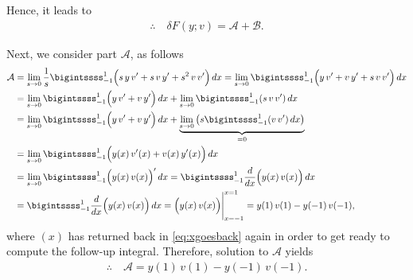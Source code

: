 \documentclass[12pt]{article}
\begin{document}
Hence, it leads to
\begin{align}
	\label{eq:sumAB}
	\therefore\quad
	\boxed{
		\delta F(y;v) = \mathcal{A} + \mathcal{B}.
	}
\end{align}

Next, we consider part $\mathcal{A}$, as follows
\begin{align}
	\mathcal{A}
	 & = 
	\lim_{s\to 0} \frac{1}{s}
	\bigintssss_{-1}^{1}
	\Big(
	s\,y\,v^\prime  
	+ s\,v\,y^\prime
	+ s^2\,v\,v^\prime
	\Big)
	\,dx          
	= 
	\lim_{s\to 0}
	\bigintssss_{-1}^{1}
	\Big(
	y\,v^\prime  
	+ v\,y^\prime
	+ s\,v\,v^\prime
	\Big)
	\,dx                      \notag \\
	 & = 
	\lim_{s\to 0}
	\bigintssss_{-1}^{1}
	\Big(
	y\,v^\prime  
	+ v\,y^\prime
	\Big)
	\,dx
	+
	\lim_{s\to 0}
	\bigintssss_{-1}^{1}
	(s\,v\,v^\prime)
	\,dx                      \notag \\
	 & = 
	\lim_{s\to 0}
	\bigintssss_{-1}^{1}
	\Big(
	y\,v^\prime  
	+ v\,y^\prime
	\Big)
	\,dx
	+
	\underbrace{\lim_{s\to 0}
		\left(
		s
		\bigintssss_{-1}^{1}
		(v\,v^\prime)
		\,dx
		\right)}_{=0}             \notag \\
	 & = 
	\lim_{s\to 0}
	\bigintssss_{-1}^{1}
	\Big(
	y(x)\,v^\prime(x)
	+ v(x)\,y^\prime(x)
	\Big)
	\,dx          
	\label{eq:xgoesback}             \\
	 & = 
	\lim_{s\to 0}
	\bigintssss_{-1}^{1}
	\Big(y(x)\,v(x)\Big)^\prime
	\,dx
	= 
	\bigintssss_{-1}^{1}
	\frac{d}{dx}
	\Big(y(x)\,v(x)\Big)
	\,dx                \notag       \\
	 & = 
	\bigintssss_{-1}^{1}
	\frac{d}{dx}
	\Big(y(x)\,v(x)\Big)
	\,dx
	= 
	\Big(y(x)\,v(x)\Big)\Bigg|_{x=-1}^{x=1}
	= y(1)\,v(1) - y(-1)\,v(-1),
\end{align}
where $(x)$ has returned back 
in \eqref{eq:xgoesback} again
in order to get ready to compute the
follow-up integral.
Therefore, solution to $\mathcal{A}$ yields
\begin{align}
	\label{eq:solutiontoA}
	\therefore\quad
	\boxed{
		\mathcal{A} = y(1)\,v(1) - y(-1)\,v(-1).
	}
\end{align}
\end{document}

